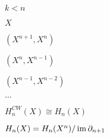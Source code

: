 \documentclass[10pt]{book}
\begin{document}
\begin{mdSnippets}
\begin{mdInlineSnippet}
$k < n$\end{mdInlineSnippet}%
\begin{mdInlineSnippet}[02129bb861061d1a052c592e2dc6b383]%
$X$\end{mdInlineSnippet}%
\begin{mdInlineSnippet}[350660f7a4dc54707d92b2d89392c010]%
$(X^{n+1}, X^n)$\end{mdInlineSnippet}%
\begin{mdInlineSnippet}[a1abf7ec7b9c3b6278627c855ac145c9]%
$(X^n, X^{n-1})$\end{mdInlineSnippet}%
\begin{mdInlineSnippet}[b67a33bf8ee0d620b86987f262f56189]%
$(X^{n-1}, X^{n-2})$\end{mdInlineSnippet}%
\begin{mdInlineSnippet}[3bde5c71067f2d0732e27d1598d0e3f1]%
$\dots$\end{mdInlineSnippet}%
\begin{mdInlineSnippet}[517fcdd73d25659ef908429291d858bc]%
$H_n^{CW}(X) \cong H_n(X)$\end{mdInlineSnippet}%
\begin{mdInlineSnippet}%
$H_n(X) = H_n(X^n) / \operatorname{im} \partial_{n+1}$\end{mdInlineSnippet}%

\end{mdSnippets}
\end{document}
